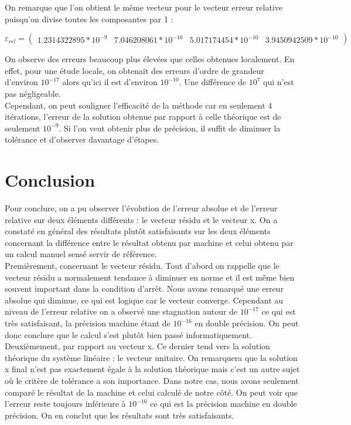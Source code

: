 \documentclass[12,french]{report}
\begin{document}
On remarque que l'on obtient le même vecteur pour le vecteur erreur relative puisqu'on divise toutes les composantes par 1 :

$$\varepsilon_{rel}=\left(\begin{array}{cccc}
1.2314322895*10^{-9} & 7.046208061*10^{-10} & 5.017174454*10^{-10} & 3.9450942509*10^{-10} \end{array}\right)$$

On observe des erreurs beaucoup plus élevées que celles obtenues localement. En effet, pour une étude locale, on obtenait des erreurs d'ordre de grandeur d'environ $10^{-17}$ alors qu'ici il est d'environ $10^{-10}$. Une différence de $10^{7}$ qui n'est pas négligeable.\\

Cependant, on peut souligner l'efficacité de la méthode car en seulement 4 itérations, l'erreur de la solution obtenue par rapport à celle théorique est de seulement $10^{-9}$. Si l'on veut obtenir plus de précision, il suffit de diminuer la tolérance et d'observer davantage d'étapes.





\chapter*{Conclusion} %

Pour conclure, on a pu observer l'évolution de l'erreur absolue et de l'erreur relative sur deux éléments différents : le vecteur résidu et le vecteur x. On a constaté en général des résultats plutôt satisfaisants sur les deux éléments concernant la différence entre le résultat obtenu par machine et celui obtenu par un calcul manuel sensé servir de référence.\\

Premièrement, concernant le vecteur résidu. Tout d'abord on rappelle que le vecteur résidu a normalement tendance à diminuer en norme et il est même bien souvent important dans la condition d'arrêt. Nous avons remarqué une erreur absolue qui diminue, ce qui est logique car le vecteur converge. Cependant au niveau de l'erreur relative on a observé une stagnation autour de $10^{-17}$ ce qui est très satisfaisant, la précision machine étant de $10^{-16}$ en double précision. On peut donc conclure que le calcul s'est plutôt bien passé informatiquement.\\

Deuxièmement, par rapport au vecteur x. Ce dernier tend vers la solution théorique du système linéaire : le vecteur unitaire. On remarquera que la solution x final n'est pas exactement égale à la solution théorique mais c'est un autre sujet où le critère de tolérance a son importance. Dans notre cas, nous avons seulement comparé le résultat de la machine et celui calculé de notre côté. On peut voir que l'erreur reste toujours inférieure à $10^{-16}$ ce qui est la précision machine en double précision. On en conclut que les résultats sont très satisfaisants. \\
\end{document}
